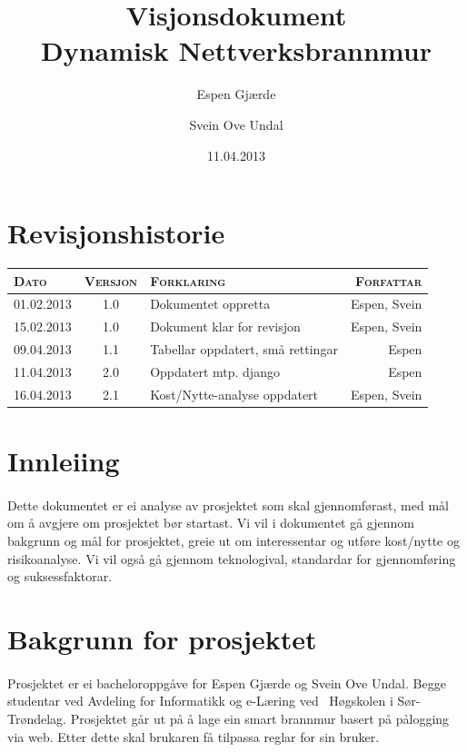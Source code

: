 \documentclass[nynorsk,12pt,a4paper]{article}
\title{Visjonsdokument\\
Dynamisk Nettverksbrannmur
}
\author{Espen Gjærde \and Svein Ove Undal}
\date{11.04.2013}
\begin{document}
\maketitle
\newpage

\section*{Revisjonshistorie}

\begin{table}[h!]
	\begin{tabular}{ l c l r }
	\centering
		\textsc{Dato} & \textsc{Versjon} & \textsc{Forklaring} & \textsc{Forfattar} \\
		\hline 
		01.02.2013 & 1.0 & Dokumentet oppretta & Espen, Svein \\ 
		15.02.2013 & 1.0 & Dokument klar for revisjon & Espen, Svein \\ 
		09.04.2013 & 1.1 & Tabellar oppdatert, små rettingar & Espen \\ 
		11.04.2013 & 2.0 & Oppdatert mtp. django & Espen \\
		16.04.2013 & 2.1 & Kost/Nytte-analyse oppdatert & Espen, Svein\\
		\hline
	\end{tabular}
\end{table}

\newpage
\tableofcontents{}

\newpage

\section{Innleiing}
\paragraph{}
Dette dokumentet er ei analyse av prosjektet som skal gjennomførast, med mål om å avgjere om prosjektet bør startast. Vi vil i dokumentet gå gjennom bakgrunn og mål for prosjektet, greie ut om interessentar og utføre kost/nytte og risikoanalyse. Vi vil også gå gjennom teknologival, standardar for gjennomføring og suksessfaktorar.

\newpage
\section{Bakgrunn for prosjektet}
\paragraph{}
Prosjektet er ei bacheloroppgåve for Espen Gjærde og Svein Ove Undal. Begge studentar ved Avdeling for Informatikk og e-Læring ved \ Høgskolen i Sør-Trøndelag. Prosjektet går ut på å lage ein smart brannmur basert på pålogging via web. Etter dette skal brukaren få tilpassa reglar for sin bruker. 
\end{document}
